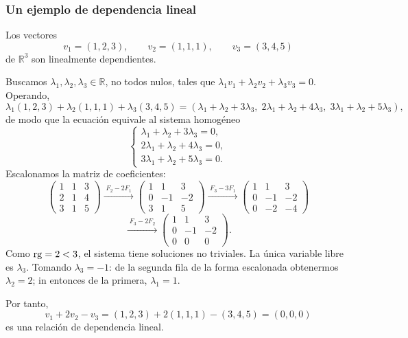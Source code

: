 \begin{frame}[allowframebreaks]
    \frametitle{Un ejemplo de dependencia lineal}


        Los vectores
        \[
            v_1=(1,2,3),\qquad v_2=(1,1,1),\qquad v_3=(3,4,5)
        \]
        de $\mathbb{R}^3$ son linealmente dependientes.

        Buscamos $\lambda_1,\lambda_2,\lambda_3\in\mathbb{R}$, no todos nulos,
        tales que $\lambda_1v_1+\lambda_2v_2+\lambda_3v_3=0$. Operando,
        \[
            \lambda_1(1,2,3)+\lambda_2(1,1,1)+\lambda_3(3,4,5)
            =
            (\lambda_1+\lambda_2+3\lambda_3,\;
             2\lambda_1+\lambda_2+4\lambda_3,\;
             3\lambda_1+\lambda_2+5\lambda_3),
        \]
        de modo que la ecuación equivale al sistema homogéneo
        \[
            \begin{cases}
                \lambda_1+\lambda_2+3\lambda_3=0,\\
                2\lambda_1+\lambda_2+4\lambda_3=0,\\
                3\lambda_1+\lambda_2+5\lambda_3=0.
            \end{cases}
        \]
        Escalonamos la matriz de coeficientes:
        \[
            \begin{pmatrix}
                1&1&3\\
                2&1&4\\
                3&1&5
            \end{pmatrix}
            \xrightarrow{\;F_2-2F_1\;}
            \begin{pmatrix}
                1&1&3\\
                0&-1&-2\\
                3&1&5
            \end{pmatrix}
            \xrightarrow{\;F_3-3F_1\;}
            \begin{pmatrix}
                1&1&3\\
                0&-1&-2\\
                0&-2&-4
            \end{pmatrix}
        \]
        \[
            \xrightarrow{\;F_3-2F_2\;}
            \begin{pmatrix}
                1&1&3\\
                0&-1&-2\\
                0&0&0
            \end{pmatrix}.
        \]
        Como $\operatorname{rg}=2<3$, el sistema tiene soluciones no triviales.
        La única variable libre es $\lambda_3$. Tomando $\lambda_3=-1$:
        de la segunda fila de la forma escalonada obtenermos $\lambda_2=2$;
        in entonces de la primera, $\lambda_1=1$.

        Por tanto,
        \[
            v_1+2v_2-v_3=(1,2,3)+2(1,1,1)-(3,4,5)=(0,0,0)
        \]
        es una relación de dependencia lineal.

\end{frame}



